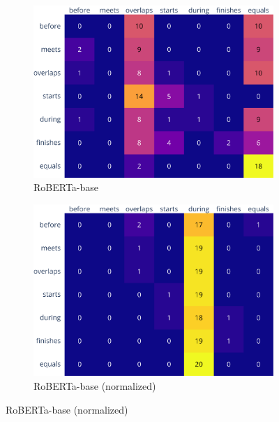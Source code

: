 \documentclass[11pt]{article}
\begin{document}
\begin{figure}
    \begin{subfigure}[b]{0.45\textwidth}
      \centering
      \includegraphics[width=0.95\columnwidth, height=0.75\textheight, keepaspectratio, valign=c]{../plots/roberta-base_confusion_matrix_counts.pdf}
      \caption{RoBERTa-base}
    \end{subfigure}
    \begin{subfigure}[b]{0.45\textwidth}
      \centering
      \includegraphics[width=0.95\columnwidth, height=0.75\textheight, keepaspectratio, valign=c]{../plots/roberta-base_confusion_matrix_counts_normalized.pdf}
      \caption{RoBERTa-base (normalized)}
    \end{subfigure}

    \vspace{1em}


\end{figure}
\end{document}
